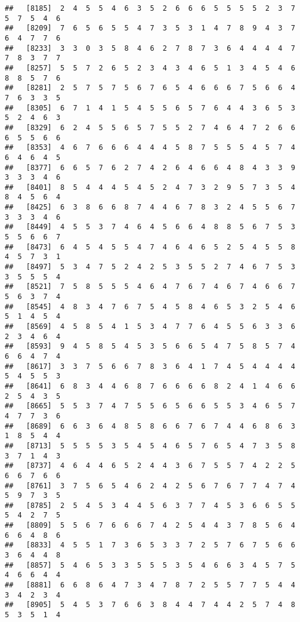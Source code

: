\documentclass[
]{book}
\begin{document}
\begin{verbatim}
##   [8185]  2  4  5  5  4  6  3  5  2  6  6  6  5  5  5  5  2  3  7  5  7  5  4  6
##   [8209]  7  6  5  6  5  5  4  7  3  5  3  1  4  7  8  9  4  3  7  6  4  7  7  6
##   [8233]  3  3  0  3  5  8  4  6  2  7  8  7  3  6  4  4  4  4  7  7  8  3  7  7
##   [8257]  5  5  7  2  6  5  2  3  4  3  4  6  5  1  3  4  5  4  6  8  8  5  7  6
##   [8281]  2  5  7  5  7  5  6  7  6  5  4  6  6  6  7  5  6  6  4  7  6  3  3  5
##   [8305]  6  7  1  4  1  5  4  5  5  6  5  7  6  4  4  3  6  5  3  5  2  4  6  3
##   [8329]  6  2  4  5  5  6  5  7  5  5  2  7  4  6  4  7  2  6  6  6  5  5  6  6
##   [8353]  4  6  7  6  6  6  4  4  4  5  8  7  5  5  5  4  5  7  4  6  4  6  4  5
##   [8377]  6  6  5  7  6  2  7  4  2  6  4  6  6  4  8  4  3  3  9  3  3  3  4  6
##   [8401]  8  5  4  4  4  5  4  5  2  4  7  3  2  9  5  7  3  5  4  8  4  5  6  4
##   [8425]  6  3  8  6  6  8  7  4  4  6  7  8  3  2  4  5  5  6  7  3  3  3  4  6
##   [8449]  4  5  5  3  7  4  6  4  5  6  6  4  8  8  5  6  7  5  3  5  5  6  6  7
##   [8473]  6  4  5  4  5  5  4  7  4  6  4  6  5  2  5  4  5  5  8  4  5  7  3  1
##   [8497]  5  3  4  7  5  2  4  2  5  3  5  5  2  7  4  6  7  5  3  3  5  5  5  4
##   [8521]  7  5  8  5  5  5  4  6  4  7  6  7  4  6  7  4  6  6  7  5  6  3  7  4
##   [8545]  4  8  3  4  7  6  7  5  4  5  8  4  6  5  3  2  5  4  6  5  1  4  5  4
##   [8569]  4  5  8  5  4  1  5  3  4  7  7  6  4  5  5  6  3  3  6  2  3  4  6  4
##   [8593]  9  4  5  8  5  4  5  3  5  6  6  5  4  7  5  8  5  7  4  6  6  4  7  4
##   [8617]  3  3  7  5  6  6  7  8  3  6  4  1  7  4  5  4  4  4  4  5  4  5  5  3
##   [8641]  6  8  3  4  4  6  8  7  6  6  6  6  8  2  4  1  4  6  6  2  5  4  3  5
##   [8665]  5  5  3  7  4  7  5  5  6  5  6  6  5  5  3  4  6  5  7  4  7  7  3  6
##   [8689]  6  6  3  6  4  8  5  8  6  6  7  6  7  4  4  6  8  6  3  1  8  5  4  4
##   [8713]  5  5  5  5  3  5  4  5  4  6  5  7  6  5  4  7  3  5  8  3  7  1  4  3
##   [8737]  4  6  4  4  6  5  2  4  4  3  6  7  5  5  7  4  2  2  5  6  6  7  6  6
##   [8761]  3  7  5  6  5  4  6  2  4  2  5  6  7  6  7  7  4  7  4  5  9  7  3  5
##   [8785]  2  5  4  5  3  4  4  5  6  3  7  7  4  5  3  6  6  5  5  5  4  2  7  5
##   [8809]  5  5  6  7  6  6  6  7  4  2  5  4  4  3  7  8  5  6  4  6  6  4  8  6
##   [8833]  4  5  5  1  7  3  6  5  3  3  7  2  5  7  6  7  5  6  6  3  6  4  4  8
##   [8857]  5  4  6  5  3  3  5  5  5  3  5  4  6  6  3  4  5  7  5  4  6  6  4  4
##   [8881]  6  6  8  6  4  7  3  4  7  8  7  2  5  5  7  7  5  4  4  3  4  2  3  4
##   [8905]  5  4  5  3  7  6  6  3  8  4  4  7  4  4  2  5  7  4  8  5  3  5  1  4

\end{verbatim}
\end{document}

